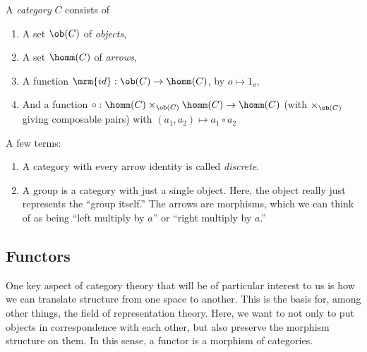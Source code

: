 \begin{definition}[Category]
  A \emph{category} $C$ consists of
  \begin{enumerate}[label=\arabic*)]
    \item A set $\ob(C)$ of \emph{objects},
    \item A set $\homm(C)$ of \emph{arrows},
    \item A function $\mrm{id} : \ob(C) \to \homm(C)$, by $o \mapsto
      1_o$,
    \item And a function $\circ : \homm(C) \times_{\ob(C)} \homm(C)
      \to \homm(C)$ (with $\times_{\ob(C)}$ giving composable pairs)
      with $(a_1, a_2) \mapsto a_1 \circ a_2$
  \end{enumerate}
\end{definition}

A few terms:
\begin{enumerate}
  \item A category with every arrow identity is called
    \emph{discrete}.
  \item A group is a category with just a single object. Here, the
    object really just represents the ``group itself.'' The arrows are
    morphisms, which we can think of as being ``left multiply by $a$''
    or ``right multiply by $a$.''
\end{enumerate}

\subsection{Functors}
One key aspect of category theory that will be of particular interest
to us is how we can translate structure from one space to another.
This is the basis for, among other things, the field of representation
theory. Here, we want to not only to put objects in correspondence
with each other, but also preserve the morphism structure on them. In
this sense, a functor is a morphism of categories.


